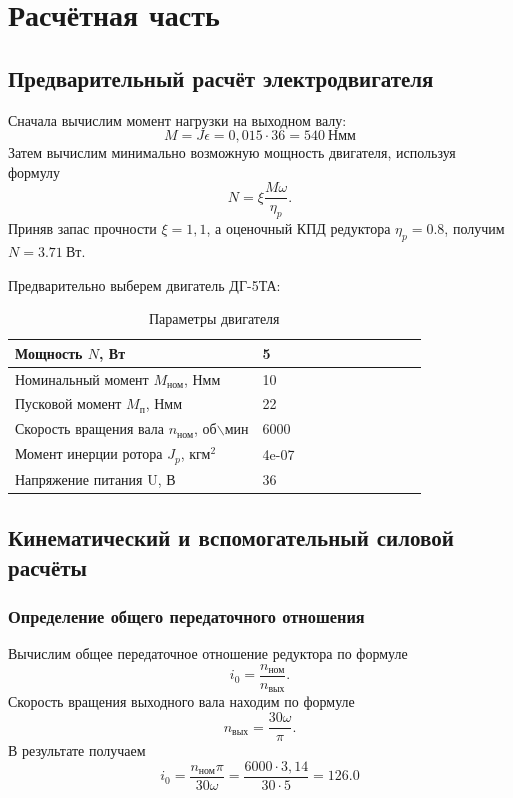 \documentclass[14pt,a4paper,russian]{scrartcl}
\begin{document}
\newcommand{\Mnom}{M_{\text{ном}}}
\newcommand{\Mp}{M_{\text{п}}}
\newcommand{\nn}{n_{\text{ном}}}
\newcommand{\nv}{n_{\text{вых}}}

\setcounter{section}{1}
\section*{Расчётная часть}
\subsection{Предварительный расчёт электродвигателя}
    Сначала вычислим момент нагрузки на выходном валу:
    \[ M = J\epsilon = 0,015\cdot36 = 540\ \text{Нмм}\]
    Затем вычислим минимально возможную мощность двигателя, используя формулу
    \[ N = \xi\frac{M\omega}{\eta_p}. \]
    Приняв запас прочности \( \xi=1,1 \), а оценочный КПД редуктора \( \eta_p=0.8 \),
    получим \( N=3.71\ \text{Вт} \).

    Предварительно выберем двигатель ДГ-5ТА:
    \begin{table}[h!]
        \begin{center}
            \begin{tabular}{|p{0.6\linewidth}|p{0.4\linewidth}|}
                \hline
                Мощность \( N \), Вт & 5 \\
                \hline
                Номинальный момент \( \Mnom \), Нмм & 10 \\
                \hline
                Пусковой момент \( \Mp \), Нмм &    22 \\
                \hline
                Скорость вращения вала \( \nn \), об\( \backslash \)мин     & 6000 \\
                \hline
                Момент инерции ротора \( J_p \), \( \text{кгм}^2 \) & 4e-07 \\
                \hline
                Напряжение питания U, В & 36 \\
                \hline
            \end{tabular}
            \caption{Параметры двигателя}\label{tab:engine}
        \end{center}
    \end{table}

    \subsection{Кинематический и вспомогательный силовой расчёты}
    \subsubsection{Определение общего передаточного отношения}
        Вычислим общее передаточное отношение редуктора по формуле 
         \[ i_0 = \frac{\nn}{\nv}. \]
         Скорость вращения выходного вала находим по формуле 
          \[ \nv = \frac{30\omega}{\pi}. \]
         В результате получаем
          \[ i_0 = \frac{\nn\pi}{30\omega} = \frac{6000\cdot3,14}{30\cdot5} = 126.0\]
    
\end{document}
